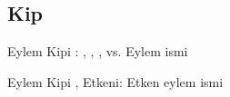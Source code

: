 



\subsection*{Kip }


\begin{eylemkipi}{Eylem Kipi : , , , vs.}
  Eylem ismi
\end{eylemkipi}

\begin{eylemkipi}{Eylem Kipi , Etkeni: }
  Etken eylem ismi
\end{eylemkipi}

